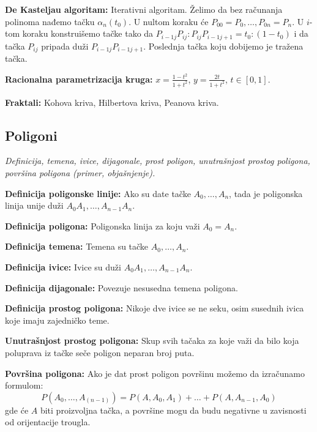 \documentclass[12pt]{article}
\begin{document}
\textbf{De Kasteljau algoritam:} Iterativni algoritam. Želimo da bez računanja
polinoma nađemo tačku $\alpha_n(t_0)$. U nultom koraku će
$P_{00}=P_0,\dotsc,P_{0n}=P_n$. U $i$-tom koraku konstruišemo tačke tako da
$P_{i-1j}P_{ij}:P_{ij}P_{i-1j+1}=t_0:(1-t_0)$ i da tačka $P_{ij}$ pripada duži
$P_{i-1j}P_{i-1j+1}$. Poslednja tačka koju dobijemo je tražena tačka.
\par

\textbf{Racionalna parametrizacija kruga:} $x=\frac{1-t^2}{1+t^2}$,
$y=\frac{2t}{1+t^2}$, $t\in[0,1]$.
\par

\textbf{Fraktali:} Kohova kriva, Hilbertova kriva, Peanova kriva.

\subsection{Poligoni}
\textit{Definicija, temena, ivice, dijagonale, prost poligon, unutrašnjost
    prostog poligona, površina poligona (primer, objašnjenje).}
\par
\vspace*{1cm}

\textbf{Definicija poligonske linije:} Ako su date tačke $A_0,\dotsc,A_n$, tada
je poligonska linija unije duži $A_0A_1,\dotsc,A_{n-1}A_n$.
\par

\textbf{Definicija poligona:} Poligonska linija za koju važi $A_0=A_n$.
\par

\textbf{Definicija temena:} Temena su tačke $A_0,\dotsc,A_n$.
\par

\textbf{Definicija ivice:} Ivice su duži $A_0A_1,\dotsc,A_{n-1}A_n$.
\par

\textbf{Definicija dijagonale:} Povezuje nesusedna temena poligona.
\par

\textbf{Definicija prostog poligona:} Nikoje dve ivice se ne seku, osim
susednih ivica koje imaju zajedničko teme.
\par

\textbf{Unutrašnjost prostog poligona:} Skup svih tačaka za koje važi da
bilo koja poluprava iz tačke seče poligon neparan broj puta.
\par

\textbf{Površina poligona:} Ako je dat prost poligon površinu možemo da
izračunamo formulom:
$$P(A_0,\dotsc,A_(n-1))=P(A,A_0,A_1)+\dotsc+P(A,A_{n-1},A_0)$$
gde će $A$ biti proizvoljna tačka, a površine mogu da budu negativne u
zavisnosti od orijentacije trougla.
\end{document}
